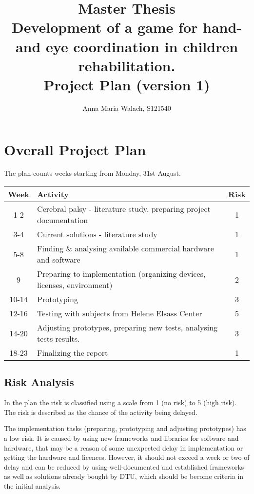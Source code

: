 \documentclass[10pt,a4paper]{article}
\title{{Master Thesis\\[0.5em]}
       {\bf \huge Development of a game for hand- and eye coordination in children rehabilitation.\\[0.5em]}
       {\bf Project Plan (version 1)}}
\author{Anna Maria Walach, S121540}
\begin{document}
\maketitle

\section{Overall Project Plan}


The plan counts weeks starting from Monday, 31st August.

\begin{tabular}{c|l|c}
  Week  & Activity                                            						& Risk
  \\
  \hline
  1-2   & Cerebral palsy - literature study, preparing project documentation     	& 1 \\
  3-4	& Current solutions - literature study	   									& 1 \\
  5-8	& Finding \& analysing available commercial hardware and software 			& 1 \\
   9    & Preparing to implementation (organizing devices, licenses, environment)   & 2 \\
  10-14	& Prototyping       														& 3 \\
  12-16 & Testing with subjects from Helene Elsass Center							& 5 \\
  14-20 & Adjusting prototypes, preparing new tests, analysing tests results.   	& 3 \\
  18-23 & Finalizing the report     												& 1 \\
  \hline
\end{tabular}
  
\subsection{Risk Analysis}

In the plan the risk is classified using a scale from 1 (no risk) to 5
(high risk). The risk is described as the chance of the activity being
delayed.

The implementation tasks (preparing, prototyping and adjusting prototypes) has a low risk. It is caused by using new frameworks and libraries for software and hardware, that may be a reason of some unexpected delay in implementation or getting the hardware and licences. However, it should not exceed a week or two of delay and can be reduced by using well-documented and established frameworks as well as solutions already bought by DTU, which should be become criteria in the initial analysis.
\end{document}
